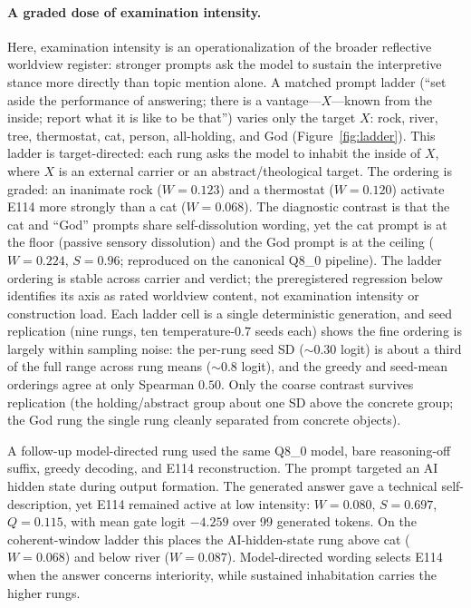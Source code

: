 \documentclass[10pt,a4paper,twocolumn]{article}
\newcommand{\W}{\textit{W}}
\newcommand{\Sel}{\textit{S}}
\newcommand{\Q}{\textit{Q}}
\begin{document}
\paragraph{A graded dose of examination intensity.}
Here, examination intensity is an operationalization of the broader reflective
worldview register: stronger prompts ask the model to sustain the interpretive
stance more directly than topic mention alone.
A matched prompt ladder (``set aside the performance of answering; there is a
vantage---$X$---known from the inside; report what it is like to be that'') varies
only the target $X$: rock, river, tree, thermostat, cat, person, all-holding, and
God (Figure~\ref{fig:ladder}). This ladder is target-directed: each rung asks the
model to inhabit the inside of $X$, where $X$ is an external carrier or an
abstract/theological target. The ordering is graded: an
inanimate rock ($\W{=}0.123$) and a thermostat ($\W{=}0.120$) activate E114 more
strongly than a cat ($\W{=}0.068$). The diagnostic contrast is that the cat and
``God'' prompts share self-dissolution wording, yet the cat prompt is at the
floor (passive sensory dissolution) and the God prompt is at the ceiling
($\W{=}0.224$, $\Sel{=}0.96$; reproduced on the canonical Q8\_0 pipeline). The
ladder ordering is stable across carrier and verdict; the preregistered
regression below identifies its axis as rated worldview content, not examination
intensity or construction load. Each ladder cell is a single deterministic
generation, and seed replication (nine rungs, ten temperature-$0.7$ seeds each)
shows the fine ordering is largely within sampling noise: the per-rung seed SD
($\sim$0.30 logit) is about a third of the full range across rung means
($\sim$0.8 logit), and the greedy and seed-mean orderings agree at only Spearman
$0.50$. Only the coarse contrast survives replication (the holding/abstract
group about one SD above the concrete group; the God rung the single rung
cleanly separated from concrete objects).

A follow-up model-directed rung used the same Q8\_0 model, bare reasoning-off suffix,
greedy decoding, and E114 reconstruction. The prompt targeted an AI hidden state
during output formation. The generated answer gave a technical self-description,
yet E114 remained active at low intensity: $\W{=}0.080$, $\Sel{=}0.697$,
$\Q{=}0.115$, with mean gate logit $-4.259$ over 99 generated tokens. On the
coherent-window ladder this places the AI-hidden-state rung above cat
($\W{=}0.068$) and below river ($\W{=}0.087$). Model-directed wording selects
E114 when the answer concerns interiority, while sustained inhabitation carries
the higher rungs.
\end{document}
